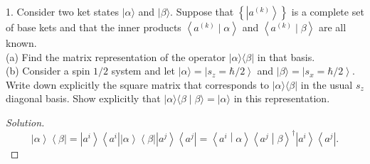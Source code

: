 
\begin{problem}
	
1. Consider two ket states $|\alpha\rangle$ and $|\beta\rangle$. Suppose that $\left\{\left|a^{(k)}\right\rangle\right\}$ is a complete set of base kets and that the inner products $\left\langle a^{(k)} \mid \alpha\right\rangle$ and $\left\langle a^{(k)} \mid \beta\right\rangle$ are all known.\\
(a) Find the matrix representation of the operator $|\alpha\rangle\langle\beta|$ in that basis.\\
(b) Consider a spin $1 / 2$ system and let $|\alpha\rangle=\left|s_z=\hbar / 2\right\rangle$ and $|\beta\rangle=\left|s_x=\hbar / 2\right\rangle$. Write down explicitly the square matrix that corresponds to $|\alpha\rangle\langle\beta|$ in the usual $s_z$ diagonal basis. Show explicitly that $|\alpha\rangle\langle\beta \mid \beta\rangle=|\alpha\rangle$ in this representation.
\end{problem}
\begin{proof}[Solution]
	\[
		\left| \alpha \right\rangle \left\langle \beta \right|  = \left| a^i \right\rangle \left\langle a^i \right| \left| \alpha \right\rangle \left\langle \beta \right| \left| a^j \right\rangle \left\langle a^j \right| 
		= \left\langle a^i \middle| \alpha \right\rangle \left\langle a^j \middle| \beta \right\rangle ^\dagger \left| a^i \right\rangle \left\langle a^j \right| 
	.\] 


\end{proof}
\newpage

